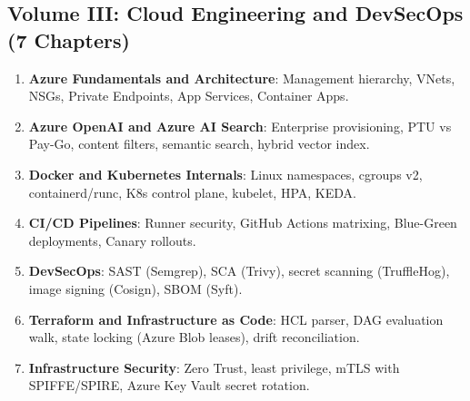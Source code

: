\documentclass[11pt,oneside]{book}
\begin{document}
\subsection*{Volume III: Cloud Engineering and DevSecOps (7 Chapters)}
\begin{enumerate}[leftmargin=18pt]
  \item \textbf{Azure Fundamentals and Architecture}: Management hierarchy, VNets, NSGs, Private Endpoints, App Services, Container Apps.
  \item \textbf{Azure OpenAI and Azure AI Search}: Enterprise provisioning, PTU vs Pay-Go, content filters, semantic search, hybrid vector index.
  \item \textbf{Docker and Kubernetes Internals}: Linux namespaces, cgroups v2, containerd/runc, K8s control plane, kubelet, HPA, KEDA.
  \item \textbf{CI/CD Pipelines}: Runner security, GitHub Actions matrixing, Blue-Green deployments, Canary rollouts.
  \item \textbf{DevSecOps}: SAST (Semgrep), SCA (Trivy), secret scanning (TruffleHog), image signing (Cosign), SBOM (Syft).
  \item \textbf{Terraform and Infrastructure as Code}: HCL parser, DAG evaluation walk, state locking (Azure Blob leases), drift reconciliation.
  \item \textbf{Infrastructure Security}: Zero Trust, least privilege, mTLS with SPIFFE/SPIRE, Azure Key Vault secret rotation.
\end{enumerate}
\end{document}
